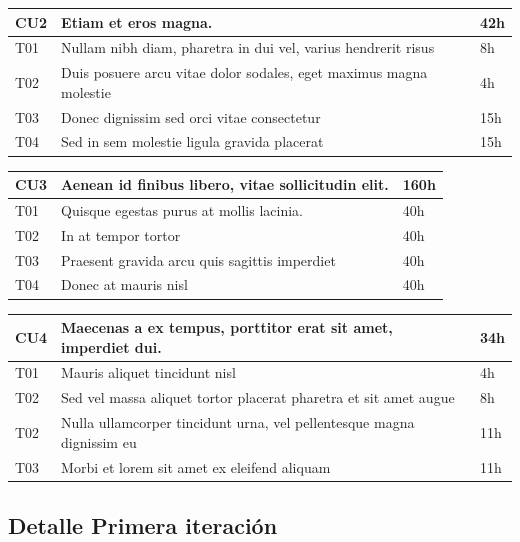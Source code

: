 \documentclass[a4paper, 10pt, twoside]{article}
\begin{document}
\vspace{1em}

\begin{tabular}{lp{13cm}l}
  \hline
  CU2 & Etiam et eros magna. & 42h \\
  \hline
  T01 & Nullam nibh diam, pharetra in dui vel, varius hendrerit risus & 8h \\
  T02 & Duis posuere arcu vitae dolor sodales, eget maximus magna molestie & 4h \\
  T03 & Donec dignissim sed orci vitae consectetur & 15h \\
  T04 & Sed in sem molestie ligula gravida placerat & 15h \\
  \hline
\end{tabular}

\vspace{1em}

\begin{tabular}{lp{13cm}l}
  \hline
  CU3 & Aenean id finibus libero, vitae sollicitudin elit. & 160h \\
  \hline
  T01 & Quisque egestas purus at mollis lacinia. & 40h \\
  T02 & In at tempor tortor & 40h \\
  T03 & Praesent gravida arcu quis sagittis imperdiet & 40h \\
  T04 & Donec at mauris nisl & 40h \\
  \hline
\end{tabular}

\vspace{1em}

\begin{tabular}{lp{13cm}l}
  \hline
  CU4 & Maecenas a ex tempus, porttitor erat sit amet, imperdiet dui. & 34h \\
  \hline
  T01 & Mauris aliquet tincidunt nisl & 4h \\
  T02 & Sed vel massa aliquet tortor placerat pharetra et sit amet augue & 8h \\
  T02 & Nulla ullamcorper tincidunt urna, vel pellentesque magna dignissim eu & 11h \\
  T03 & Morbi et lorem sit amet ex eleifend aliquam & 11h \\
  \hline
\end{tabular}


\subsection{Detalle Primera iteración}
\end{document}
